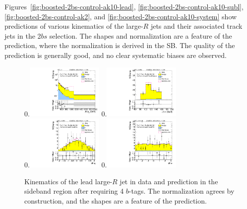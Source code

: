 Figures~\ref{fig:boosted-2bs-control-ak10-lead}, \ref{fig:boosted-2bs-control-ak10-subl}, \ref{fig:boosted-2bs-control-ak2},  and \ref{fig:boosted-2bs-control-ak10-system} show predictions of various kinematics of the large-$R$ jets and their associated track jets in the 2$bs$ selection. The shapes and normalization are a feature of the prediction, where the normalization is derived in the SB. The quality of the prediction is generally good, and no clear systematic biases are observed.

\begin{figure}[htbp!]
\begin{center}
0.\includegraphics[width=0.33\textwidth, angle=270]{./figures/boosted/Control/Moriond_FourTag_Control_leadHCand_Pt_m_1.pdf}
0.\includegraphics[width=0.33\textwidth, angle=270]{./figures/boosted/Control/Moriond_FourTag_Control_leadHCand_Mass_s.pdf}\\
0.\includegraphics[width=0.33\textwidth, angle=270]{./figures/boosted/Control/Moriond_FourTag_Control_leadHCand_Eta.pdf}
0.\includegraphics[width=0.33\textwidth, angle=270]{./figures/boosted/Control/Moriond_FourTag_Control_leadHCand_Phi.pdf}
  \caption{Kinematics of the lead large-$R$ jet in data and prediction in the sideband region after requiring 4 $b$-tags. The normalization agrees by construction, and the shapes are a feature of the prediction.}
  \label{fig:boosted-4b-control-ak10-lead}
\end{center}
\end{figure}

